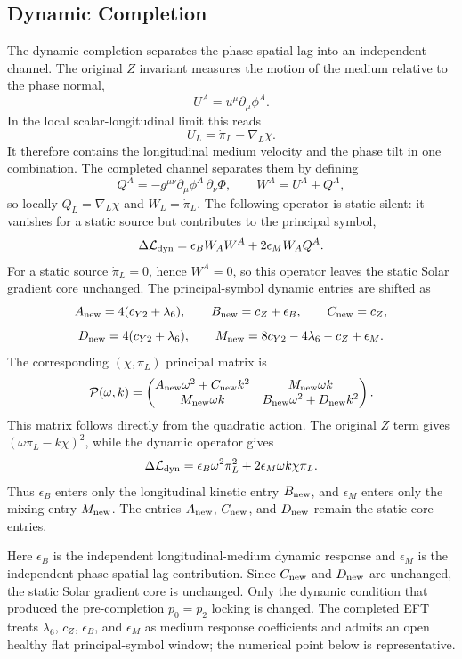 \documentclass[12pt,a4paper]{article}
\begin{document}
\subsection{Dynamic Completion}

The dynamic completion separates the phase-spatial lag into an independent
channel.  The original $Z$ invariant measures the motion of the medium
relative to the phase normal,
\[
U^A=u^\mu\partial_\mu\phi^A.
\]
In the local scalar-longitudinal limit this reads
\[
U_L=\dot\pi_L-\nabla_L\chi.
\]
It therefore contains the longitudinal medium velocity and the phase tilt in
one combination.  The completed channel separates them by defining
\[
Q^A=-g^{\mu\nu}\partial_\mu\phi^A\,\partial_\nu\Phi,\qquad
W^A=U^A+Q^A,
\]
so locally $Q_L=\nabla_L\chi$ and $W_L=\dot\pi_L$.  The following operator is
static-silent: it vanishes for a static source but contributes to the
principal symbol,
\[
\Delta\mathcal L_{\rm dyn}
=\epsilon_B W_A W^A+2\epsilon_M W_A Q^A.
\]
For a static source $\dot\pi_L=0$, hence $W^A=0$, so this operator leaves the
static Solar gradient core unchanged.  The principal-symbol dynamic entries
are shifted as
\[
A_{\rm new}=4(c_{Y2}+\lambda_6),\qquad
B_{\rm new}=c_Z+\epsilon_B,\qquad
C_{\rm new}=c_Z,
\]
\[
D_{\rm new}=4(c_{Y2}+\lambda_6),\qquad
M_{\rm new}=8c_{Y2}-4\lambda_6-c_Z+\epsilon_M.
\]
The corresponding $(\chi,\pi_L)$ principal matrix is
\[
\mathcal P(\omega,k)=
\begin{pmatrix}
A_{\rm new}\omega^2+C_{\rm new}k^2 & M_{\rm new}\omega k\\
M_{\rm new}\omega k & B_{\rm new}\omega^2+D_{\rm new}k^2
\end{pmatrix}.
\]
This matrix follows directly from the quadratic action.  The original $Z$ term gives
$(\omega\pi_L-k\chi)^2$, while the dynamic operator gives
\[
\Delta\mathcal L_{\rm dyn}
=\epsilon_B\omega^2\pi_L^2+2\epsilon_M\omega k\chi\pi_L.
\]
Thus $\epsilon_B$ enters only the longitudinal kinetic entry $B_{\rm new}$,
and $\epsilon_M$ enters only the mixing entry $M_{\rm new}$.  The entries
$A_{\rm new}$, $C_{\rm new}$, and $D_{\rm new}$ remain the static-core entries.

Here $\epsilon_B$ is the independent longitudinal-medium dynamic response and
$\epsilon_M$ is the independent phase-spatial lag contribution.  Since $C_{\rm
new}$ and $D_{\rm new}$ are unchanged, the static Solar gradient core is
unchanged.  Only the dynamic condition that produced the pre-completion $p_0=p_2$ locking is
changed.
The completed EFT treats $\lambda_6$, $c_Z$, $\epsilon_B$, and $\epsilon_M$ as
medium response coefficients and admits an open healthy flat principal-symbol
window; the numerical point below is representative.
\end{document}
